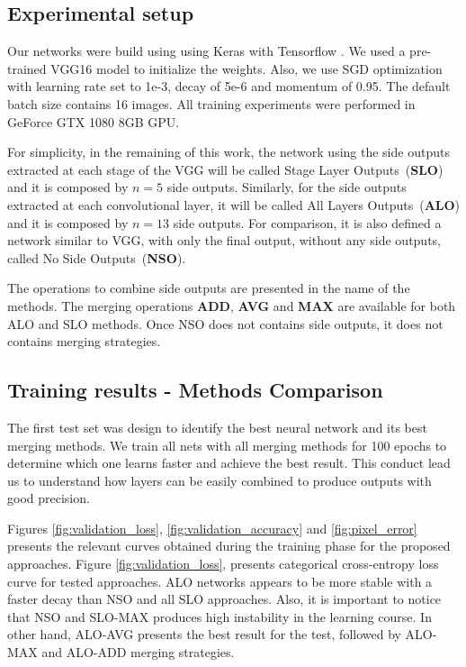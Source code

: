 \subsection{Experimental setup}
   
Our networks were build using using Keras \cite{chollet2015keras} with Tensorflow \cite{tensorflow2015-whitepaper}. We used a pre-trained VGG16 model to initialize the weights. Also, we use SGD optimization with learning rate set to 1e-3, decay of 5e-6 and momentum of 0.95. The default batch size contains 16 images. All training experiments were performed in GeForce GTX 1080 8GB GPU.

For simplicity, in the remaining of this work, the network using the side outputs extracted at each stage of the VGG will be called Stage Layer Outputs~(\textbf{SLO}) and it is composed by $n=5$ side outputs. Similarly, for the side outputs extracted at each convolutional layer, it will be called All Layers Outputs~(\textbf{ALO}) and it is composed by $n=13$ side outputs. For comparison, it is also defined a network similar to VGG, with only the final output, without any side outputs, called No Side Outputs~(\textbf{NSO}).

The operations to combine side outputs are presented in the name of the methods. The merging operations \textbf{ADD}, \textbf{AVG} and \textbf{MAX} are available for both ALO and SLO methods. Once NSO does not contains side outputs, it does not contains merging strategies.

\subsection{Training results - Methods Comparison}

The first test set was design to identify the best neural network and its best merging methods. We train all nets with all merging methods for 100 epochs to determine which one learns faster and achieve the best result. This conduct lead us to understand how layers can be easily combined to produce outputs with good precision.

Figures \ref{fig:validation_loss}, \ref{fig:validation_accuracy} and \ref{fig:pixel_error} presents the relevant curves obtained during the training phase for the proposed approaches. 
Figure \ref{fig:validation_loss}, presents categorical cross-entropy loss curve for tested approaches. ALO networks appears to be more stable with a faster decay than NSO and all SLO approaches. Also, it is important to notice that NSO and SLO-MAX produces high instability in the learning course. In other hand, ALO-AVG presents the best result for the test, followed by ALO-MAX and ALO-ADD merging strategies.

